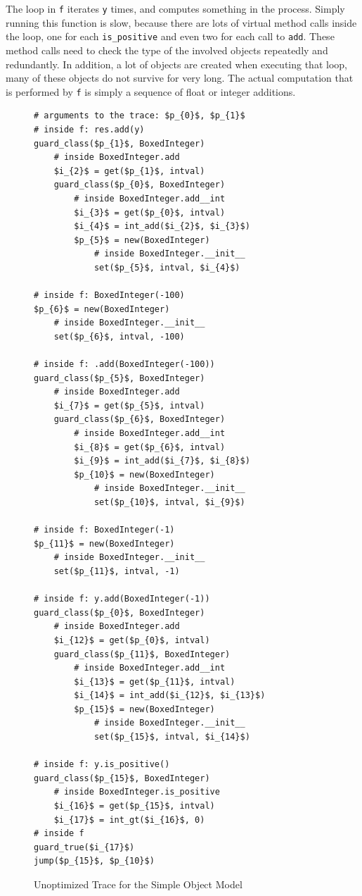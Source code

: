 \documentclass[preprint]{sigplanconf}
\begin{document}
The loop in \lstinline{f} iterates \lstinline{y} times, and computes something in the process.
Simply running this function is slow, because there are lots of virtual method
calls inside the loop, one for each \lstinline{is_positive} and even two for each
call to \lstinline{add}. These method calls need to check the type of the involved
objects repeatedly and redundantly. In addition, a lot of objects are created
when executing that loop, many of these objects do not survive for very long.
The actual computation that is performed by \lstinline{f} is simply a sequence of
float or integer additions.


\begin{figure}
\begin{lstlisting}[mathescape]
# arguments to the trace: $p_{0}$, $p_{1}$
# inside f: res.add(y)
guard_class($p_{1}$, BoxedInteger)
    # inside BoxedInteger.add
    $i_{2}$ = get($p_{1}$, intval)
    guard_class($p_{0}$, BoxedInteger)
        # inside BoxedInteger.add__int
        $i_{3}$ = get($p_{0}$, intval)
        $i_{4}$ = int_add($i_{2}$, $i_{3}$)
        $p_{5}$ = new(BoxedInteger)
            # inside BoxedInteger.__init__
            set($p_{5}$, intval, $i_{4}$)

# inside f: BoxedInteger(-100) 
$p_{6}$ = new(BoxedInteger)
    # inside BoxedInteger.__init__
    set($p_{6}$, intval, -100)

# inside f: .add(BoxedInteger(-100))
guard_class($p_{5}$, BoxedInteger)
    # inside BoxedInteger.add
    $i_{7}$ = get($p_{5}$, intval)
    guard_class($p_{6}$, BoxedInteger)
        # inside BoxedInteger.add__int
        $i_{8}$ = get($p_{6}$, intval)
        $i_{9}$ = int_add($i_{7}$, $i_{8}$)
        $p_{10}$ = new(BoxedInteger)
            # inside BoxedInteger.__init__
            set($p_{10}$, intval, $i_{9}$)

# inside f: BoxedInteger(-1)
$p_{11}$ = new(BoxedInteger)
    # inside BoxedInteger.__init__
    set($p_{11}$, intval, -1)

# inside f: y.add(BoxedInteger(-1))
guard_class($p_{0}$, BoxedInteger)
    # inside BoxedInteger.add
    $i_{12}$ = get($p_{0}$, intval)
    guard_class($p_{11}$, BoxedInteger)
        # inside BoxedInteger.add__int
        $i_{13}$ = get($p_{11}$, intval)
        $i_{14}$ = int_add($i_{12}$, $i_{13}$)
        $p_{15}$ = new(BoxedInteger)
            # inside BoxedInteger.__init__
            set($p_{15}$, intval, $i_{14}$)

# inside f: y.is_positive()
guard_class($p_{15}$, BoxedInteger)
    # inside BoxedInteger.is_positive
    $i_{16}$ = get($p_{15}$, intval)
    $i_{17}$ = int_gt($i_{16}$, 0)
# inside f
guard_true($i_{17}$)
jump($p_{15}$, $p_{10}$)
\end{lstlisting}
\caption{Unoptimized Trace for the Simple Object Model}
\label{fig:unopt-trace}
\end{figure}
\end{document}

